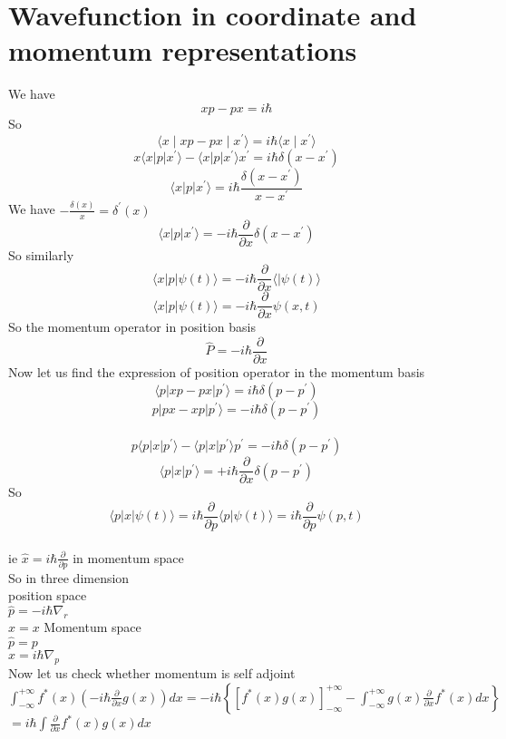 \section{Wavefunction in coordinate and momentum representations}
We have $$xp-px=i\hbar$$
So $$\langle x\mid xp-px\mid x^{\prime}\rangle=i\hbar\langle x\mid x^{\prime}\rangle$$
$$x\langle x |p|x^{\prime}\rangle -\langle x |p|x^{\prime}\rangle x^{\prime}=i\hbar \delta(x-x^{\prime})$$
$$\langle x|p|x^{\prime}\rangle =i\hbar \frac{\delta(x-x^{\prime})}{x-x^{\prime}}$$
We have $-\frac{\delta(x)}{x}=\delta^{\prime}(x)$\\
$$\langle x|p|x^{\prime}\rangle=-i\hbar \frac{\partial}{\partial x}\delta(x-x^{\prime})$$
So similarly $$\langle x|p|\psi(t)\rangle=-i\hbar\frac{\partial}{\partial x} \langle|\psi(t)\rangle$$
$$\langle x|p|\psi(t)\rangle=-i\hbar \frac{\partial }{\partial x}\psi(x,t)$$
So the momentum operator in position basis \\
$$\hat{P}=-i\hbar \frac{\partial}{\partial x}$$
Now let us find the expression of position operator in the momentum basis \\
$$\langle p|xp-px|p^{\prime}\rangle =i\hbar \delta (p-p^{\prime})$$
$$p|px-xp|p^{\prime}\rangle =-i\hbar \delta(p-p^{\prime})$$\\
$$p\langle p|x|p^{\prime}\rangle -\langle p|x|p^{\prime}\rangle p^{\prime}=-i\hbar\delta(p-p^{\prime})$$
$$\langle p|x|p^{\prime}\rangle=+i\hbar\frac{\partial}{\partial x}\delta(p-p^{\prime})$$
So $$\langle p|x|\psi(t)\rangle =i\hbar\frac{\partial}{\partial p} \langle p|\psi(t)\rangle=i\hbar\frac{\partial}{\partial p}\psi (p,t)$$\\
ie $\hat{x}=i\hbar\frac{\partial}{\partial p}$ in momentum space\\
So in three dimension \\
position space\\
$\hat{p}=-i\hbar \nabla_{r}$\\
$\hat{x}=x$
Momentum space\\
$\hat{p}=p$\\
$\hat{x}=i\hbar \nabla_{p}$\\
Now let us check whether momentum is self adjoint\\
$\int_{-\infty}^{+\infty} f^*(x)\left( -i\hbar \frac{\partial}{\partial x}g(x)\right)dx=-i\hbar\left\lbrace  \left[ f^{*}(x)g(x) \right]_{-\infty}^{+\infty}-\int_{-\infty}^{+\infty} g(x)\frac{\partial}{\partial x}f^*(x)dx\right\rbrace $\\
$=i\hbar \int \frac{\partial}{\partial x} f^*(x) g(x)dx$
